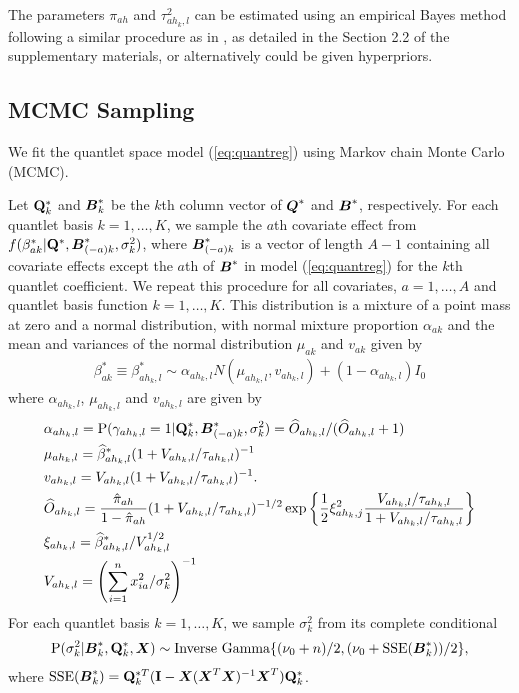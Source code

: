 \documentclass[11pt]{article}
\newcommand{\bB}{\mbox{\boldmath $B$}}
\newcommand{\bX}{\mbox{\boldmath $X$}}
\newcommand{\bQ}{\mbox{\boldmath $Q$}}
\newcommand{\bbeta}{\mbox{\boldmath $\beta$}}
\begin{document}
The parameters $\pi_{ah}$ and $\tau^2_{ah_k,l}$ can be estimated using an empirical Bayes method following a similar procedure as in  \cite{morris2006wavelet}, as detailed in the Section 2.2 of the supplementary materials, or alternatively could be given hyperpriors. 


\subsection{ {\bf MCMC Sampling}}
We fit the quantlet space model (\ref{eq:quantreg}) using Markov chain Monte Carlo (MCMC).%
  
Let ${\bf Q}_k^*$ and ${\bB}_{k}^{\ast}$  
  be the $k$th column vector of ${\bQ}^{\ast}$ and ${\bB}^{\ast}$, respectively.
  For each quantlet basis $k=1,\ldots,K$, we sample the $a$th covariate effect from $f(\beta_{ak}^{\ast} | {\bf Q}^{\ast}, {\bB}_{(-a)k}^{\ast},\sigma^2_k)$, where ${\bB}_{(-a)k}^{\ast}$ is a vector of length $A-1$ containing all covariate effects except the $a$th of $\bB^*$  in  model (\ref{eq:quantreg}) for the $k$th quantlet coefficient.
 We repeat this procedure for all covariates,  $a=1, \dots, A$ and quantlet basis function $k=1,\ldots,K$.
This distribution is a mixture of  a point mass at zero and a normal distribution, with normal mixture proportion $\alpha_{ak}$ and the mean and variances of the normal distribution $\mu_{ak}$ and $v_{ak}$ given by 
   \begin{align*}
   \beta_{ak}^{\ast} \equiv\beta_{ah_k,l}^*  \sim 
   \alpha_{ah_k,l}
    N( \mu_{ah_k,l}, v_{ah_k,l}) +
  (1- \alpha_{ah_k,l})I_{0}
\end{align*} 
where  $\alpha_{ah_k,l}$, $\mu_{ah_k,l}$ and  $v_{ah_k,l}$ are given by 
   \begin{align*}
&\alpha_{ah_k,l}
=     \text{P}( \gamma_{ah_k,l} =1 |  {\bf Q}^{\ast}_k, {\bB}_{(-a)k}^{\ast},\sigma^2_k)   
=  \widehat{O}_{ah_k,l}/( \widehat{O}_{ah_k,l}+1)\\
&\mu_{ah_k,l}= \widehat{\beta}_{ah_k,l}^{\ast}(1+ V_{ah_k,l}/\tau_{ah_k,l})^{-1} \\
&v_{ah_k,l}= V_{ah_k,l}(1+ V_{ah_k,l}/\tau_{ah_k,l} )^{-1} .  \notag \\
& \widehat{O}_{ah_k,l}=  \frac{\hat \pi_{ah} }{1 - \hat \pi_{ah} }(1 + V_{ah_k,l}/\tau_{ah_k,l} )^{-1/2}
  \exp{\biggl \{ 
  \frac{1}{2}\xi_{ah_k,j}^2 \frac{ V_{ah_k,l}/\tau_{ah_k,l} }{1+V_{ah_k,l}/\tau_{ah_k,l} } 
  \biggr \}} \\
 & \xi_{ah_k,l}= \widehat{\beta}_{ah_k,l}^* /V_{ah_k,l}^{1/2} \\
  & V_{ah_k,l}=\left(\sum_{i=1}^{n} x_{ia}^2/\sigma_{k}^2\right)^{-1} 
\end{align*} 
For each quantlet basis $k=1,\ldots,K$, we sample $\sigma_k^2$ from 
its complete conditional
 \begin{align*}
\text{P}( \sigma_{k}^{2}|{\bB}^{\ast}_k, {\bf Q}^{\ast}_k,  {\bX})
\sim  \text{Inverse Gamma}\{  (\nu_0+n)/2,
(\nu_0+ \text{SSE}({\bB}^{\ast}_k) )/2\},
\end{align*}
where $\text{SSE}({\bB}^{\ast}_k)= {\bf Q}_k^{\ast  T}({\bf I} -{\bX}
( {\bX}^{T}{\bX}   )^{-1}{\bX}^{T} ){\bf Q}_k^{\ast}$.    
\end{document}
